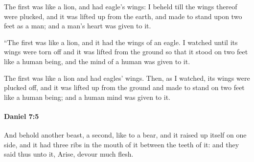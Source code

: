 			\begin{versebox}
					\item[BHS] 
					\item[LXX] 
					\item[ASV] The first was like a lion, and had eagle's wings: I beheld till the wings thereof were plucked, and it was lifted up from the earth, and made to stand upon two feet as a man; and a man's heart was given to it.
					\item[NIV] “The first was like a lion, and it had the wings of an eagle. I watched until its wings were torn off and it was lifted from the ground so that it stood on two feet like a human being, and the mind of a human was given to it.
					\item[NRSV] The first was like a lion and had eagles’ wings. Then, as I watched, its wings were plucked off, and it was lifted up from the ground and made to stand on two feet like a human being; and a human mind was given to it.
			\end{versebox}

		\paragraph{Daniel 7:5} %
			\label{DANIEL-7-5}

			And behold another beast, a second, like to a bear, and it raised up itself on one side, and it had three ribs in the mouth of it between the teeth of it: and they said thus unto it, Arise, devour much flesh.

